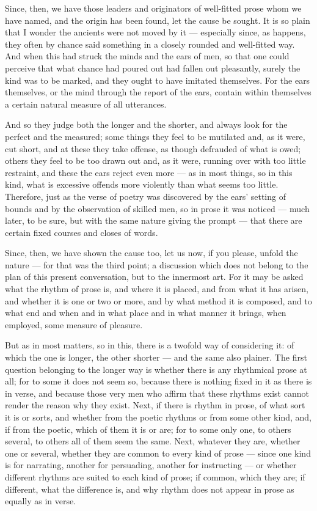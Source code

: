  Since, then, we have those leaders and originators of well-fitted prose whom we have named, and the origin has been found, let the cause be sought. It is so plain that I wonder the ancients were not moved by it — especially since, as happens, they often by chance said something in a closely rounded and well-fitted way. And when this had struck the minds and the ears of men, so that one could perceive that what chance had poured out had fallen out pleasantly, surely the kind was to be marked, and they ought to have imitated themselves. For the ears themselves, or the mind through the report of the ears, contain within themselves a certain natural measure of all utterances.

 And so they judge both the longer and the shorter, and always look for the perfect and the measured; some things they feel to be mutilated and, as it were, cut short, and at these they take offense, as though defrauded of what is owed; others they feel to be too drawn out and, as it were, running over with too little restraint, and these the ears reject even more — as in most things, so in this kind, what is excessive offends more violently than what seems too little. Therefore, just as the verse of poetry was discovered by the ears' setting of bounds and by the observation of skilled men, so in prose it was noticed — much later, to be sure, but with the same nature giving the prompt — that there are certain fixed courses and closes of words.

 Since, then, we have shown the cause too, let us now, if you please, unfold the nature — for that was the third point; a discussion which does not belong to the plan of this present conversation, but to the innermost art. For it may be asked what the rhythm of prose is, and where it is placed, and from what it has arisen, and whether it is one or two or more, and by what method it is composed, and to what end and when and in what place and in what manner it brings, when employed, some measure of pleasure.

 But as in most matters, so in this, there is a twofold way of considering it: of which the one is longer, the other shorter — and the same also plainer. The first question belonging to the longer way is whether there is any rhythmical prose at all; for to some it does not seem so, because there is nothing fixed in it as there is in verse, and because those very men who affirm that these rhythms exist cannot render the reason why they exist. Next, if there is rhythm in prose, of what sort it is or sorts, and whether from the poetic rhythms or from some other kind, and, if from the poetic, which of them it is or are; for to some only one, to others several, to others all of them seem the same. Next, whatever they are, whether one or several, whether they are common to every kind of prose — since one kind is for narrating, another for persuading, another for instructing — or whether different rhythms are suited to each kind of prose; if common, which they are; if different, what the difference is, and why rhythm does not appear in prose as equally as in verse.

